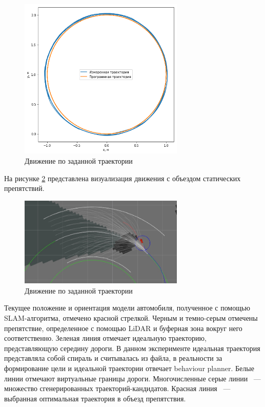 \begin{figure}[h]
    \centering
    \includegraphics[width=0.7\textwidth]{images/path_moving_test}
    \caption{Движение по заданной траектории}
    \label{img:path_moving_test}
\end{figure}

На рисунке \ref{img:obstacle_avoidance} представлена визуализация движения с объездом статических
препятствий.

\begin{figure}[h]
    \centering
    \includegraphics[width=0.7\textwidth]{images/obstacle_avoidance}
    \caption{Движение по заданной траектории}
    \label{img:obstacle_avoidance}
\end{figure}

Текущее положение и ориентация модели автомобиля, полученное с помощью SLAM-алгоритма, отмечено
красной стрелкой. Черным и темно-серым отмечены препятствие, определенное с помощью LiDAR и буферная
зона вокруг него соответственно. Зеленая линия отмечает идеальную траекторию, представляющую
середину дороги. В данном эксперименте идеальная траектория представляла собой спираль и считывалась
из файла, в реальности за формирование цели и идеальной траектории отвечает behaviour planner.
Белые линии отмечают виртуальные границы дороги. Многочисленные серые линии ~--- множество
сгенерированных траекторий-кандидатов. Красная линия ~--- выбранная оптимальная траектория
в объезд препятствия.



